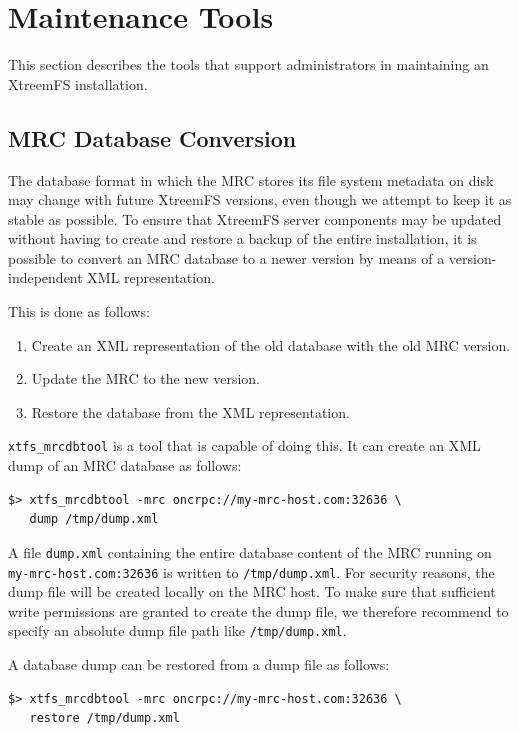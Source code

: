 \documentclass[a4paper,10pt]{book}
\begin{document}
\section{Maintenance Tools}

This section describes the tools that support administrators in maintaining an XtreemFS installation.

\subsection{MRC Database Conversion}
\label{sec:mrcdbtools}

The database format in which the MRC stores its file system metadata on disk may change with future XtreemFS versions, even though we attempt to keep it as stable as possible. To ensure that XtreemFS server components may be updated without having to create and restore a backup of the entire installation, it is possible to convert an MRC database to a newer version by means of a version-independent XML representation.

This is done as follows:
\begin{enumerate}
  \item Create an XML representation of the old database with the old MRC version.
  \item Update the MRC to the new version.
  \item Restore the database from the XML representation.
\end{enumerate}

\texttt{xtfs\_mrcdbtool} is a tool that is capable of doing this. It can create an XML dump of an MRC database as follows:

\begin{verbatim}
$> xtfs_mrcdbtool -mrc oncrpc://my-mrc-host.com:32636 \
   dump /tmp/dump.xml
\end{verbatim}

A file \texttt{dump.xml} containing the entire database content of the MRC running on \texttt{my-mrc-host.com:32636} is written to \texttt{/tmp/dump.xml}. For security reasons, the dump file will be created locally on the MRC host. To make sure that sufficient write permissions are granted to create the dump file, we therefore recommend to specify an absolute dump file path like \texttt{/tmp/dump.xml}.

A database dump can be restored from a dump file as follows:

\begin{verbatim}
$> xtfs_mrcdbtool -mrc oncrpc://my-mrc-host.com:32636 \
   restore /tmp/dump.xml
\end{verbatim}
\end{document}
